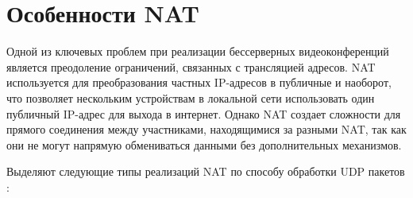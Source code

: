 \section{Особенности NAT}

Одной из ключевых проблем при реализации бессерверных видеоконференций является преодоление ограничений, связанных с трансляцией адресов.
NAT используется для преобразования частных IP-адресов в публичные и наоборот, что позволяет нескольким устройствам в локальной сети использовать один публичный IP-адрес для выхода в интернет.
Однако NAT создает сложности для прямого соединения между участниками, находящимися за разными NAT, так как они не могут напрямую обмениваться данными без дополнительных механизмов.

Выделяют следующие типы реализаций NAT по способу обработки UDP пакетов \cite{nat-types}:
